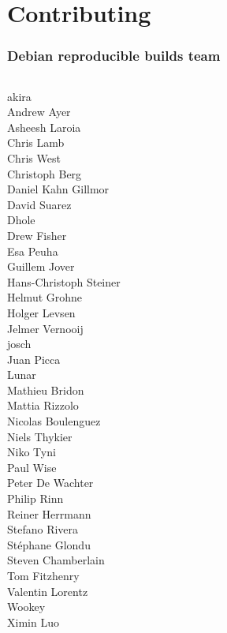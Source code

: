 \documentclass[14pt,aspectratio=169]{beamer}
\begin{document}
\section{Contributing}

\begin{frame}
 \frametitle{Debian reproducible builds team} \pause
 \begin{center}
  \begin{columns}
   \small
    {akira} \\
    {Andrew Ayer} \\
    {Asheesh Laroia} \\
    {{\color{debianblue} Chris Lamb}} \\
    {Chris West} \\
    {Christoph Berg} \\
    {Daniel Kahn Gillmor} \\
    David Suarez \\
    {Dhole} \\
    Drew Fisher \\
    Esa Peuha \\
    {Guillem Jover} \\
    Hans-Christoph Steiner \\
    {Helmut Grohne} \\
    {Holger Levsen} \\
    {Jelmer Vernooij} \\
    {josch} \\
    Juan Picca \\
    {Lunar} \\
    Mathieu Bridon \\
    {Mattia Rizzolo} \\
    Nicolas Boulenguez \\
    {Niels Thykier} \\
    Niko Tyni \\
    {Paul Wise} \\
    Peter De Wachter \\
    Philip Rinn \\
    {Reiner Herrmann} \\
    {Stefano Rivera} \\
    {Stéphane Glondu} \\
    {Steven Chamberlain} \\
    Tom Fitzhenry \\
    Valentin Lorentz \\
    {Wookey} \\
    {Ximin Luo} \\
  \end{columns}
 \end{center}
\end{frame}
\end{document}
